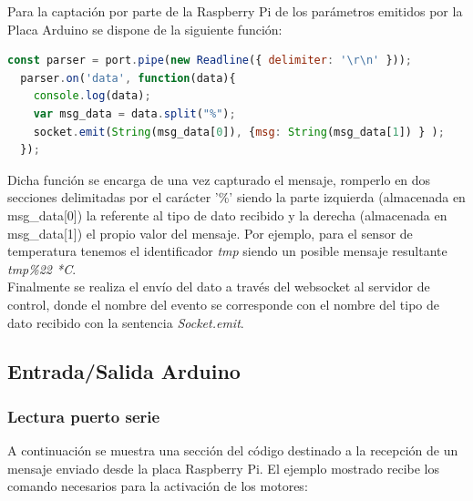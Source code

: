 Para la captación por parte de la Raspberry Pi de los parámetros emitidos por la Placa Arduino se dispone de la siguiente función:\\

\begin{lstlisting}[language=JavaScript]
  const parser = port.pipe(new Readline({ delimiter: '\r\n' }));
  parser.on('data', function(data){
    console.log(data);
    var msg_data = data.split("%");
    socket.emit(String(msg_data[0]), {msg: String(msg_data[1]) } );
  });

\end{lstlisting}

Dicha función se encarga de una vez capturado el mensaje, romperlo en dos secciones delimitadas por el carácter '\%' siendo la parte izquierda (almacenada en msg_data[0]) la referente al tipo de dato recibido
y la derecha (almacenada en msg_data[1]) el propio valor del mensaje. Por ejemplo, para el sensor de temperatura tenemos el identificador \emph{tmp} siendo un posible mensaje
resultante \emph{tmp\%22 *C}.\\

Finalmente se realiza el envío del dato a través del websocket al servidor de control, donde el nombre del evento se corresponde con el nombre del tipo de dato recibido con la sentencia \emph{Socket.emit}.\\

\subsection{Entrada/Salida Arduino}

\subsubsection{Lectura puerto serie}

A continuación se muestra una sección del código destinado a la recepción de un mensaje enviado desde la placa Raspberry Pi. El ejemplo mostrado recibe los comando necesarios para
la activación de los motores:\\


